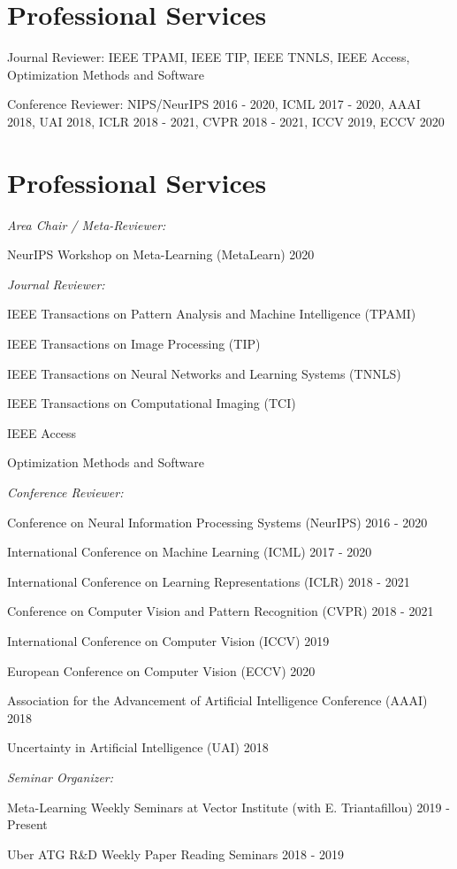 \if{}
\section{\sc Professional Services}
\begin{list2}
\item Journal Reviewer: IEEE TPAMI, IEEE TIP, IEEE TNNLS, IEEE Access, Optimization Methods and Software
\item Conference Reviewer:  NIPS/NeurIPS 2016 - 2020, ICML 2017 - 2020, AAAI 2018, UAI 2018, ICLR 2018 - 2021, CVPR 2018 - 2021, ICCV 2019, ECCV 2020
\end{list2}
\else
\section{\sc Professional Services}
{\it Area Chair / Meta-Reviewer:}
\begin{list2}
\item NeurIPS Workshop on Meta-Learning (MetaLearn) \hfill 2020
\end{list2}

{\it Journal Reviewer:}
\begin{list2}
\item IEEE Transactions on Pattern Analysis and Machine Intelligence (TPAMI)
\item IEEE Transactions on Image Processing (TIP)
\item IEEE Transactions on Neural Networks and Learning Systems (TNNLS)
\item IEEE Transactions on Computational Imaging (TCI)
\item IEEE Access
\item Optimization Methods and Software
\end{list2}

{\it Conference Reviewer:}
\begin{list2}
\item Conference on Neural Information Processing Systems (NeurIPS) \hfill 2016 - 2020
\item International Conference on Machine Learning (ICML) \hfill 2017 - 2020
\item International Conference on Learning Representations (ICLR) \hfill 2018 - 2021
\item Conference on Computer Vision and Pattern Recognition (CVPR) \hfill 2018 - 2021
\item International Conference on Computer Vision (ICCV) \hfill 2019
\item European Conference on Computer Vision (ECCV) \hfill 2020
\item Association for the Advancement of Artificial Intelligence Conference (AAAI) \hfill 2018
\item Uncertainty in Artificial Intelligence (UAI) \hfill 2018
\end{list2}

{\it Seminar Organizer:}
\begin{list2}
\item Meta-Learning Weekly Seminars at Vector Institute (with E. Triantafillou) \hfill 2019 - Present
\item Uber ATG R\&D Weekly Paper Reading Seminars \hfill 2018 - 2019
\end{list2}
\vspace{0.1in}
\fi